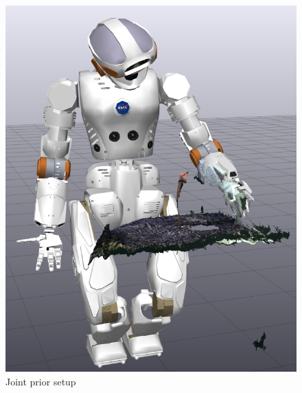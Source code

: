 \begin{figure}
\centering
\begin{minipage}{0.45\textwidth}
\centering
\includegraphics[width=1.0\textwidth]{images/eval_prior/sequence/prior_setting.png} 
\caption{Joint prior setup}
\label{fig:prior_setting}
\end{minipage}
%
\hspace{0.3cm}
\begin{minipage}{0.45\textwidth}
\vspace{0.8cm}
\centering
{}

\end{minipage}
\end{figure}

